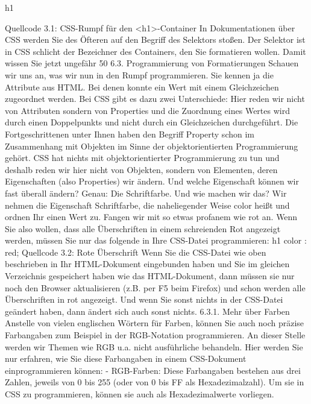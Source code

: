 h1 {
	
}
Quellcode 3.1: CSS-Rumpf für den <h1>-Container
In Dokumentationen über CSS werden Sie des Öfteren auf den Begriff des Selektors stoßen. Der Selektor ist in CSS schlicht der Bezeichner des Containers, den Sie formatieren wollen.
Damit wissen Sie jetzt ungefähr 50%
6.3.	Programmierung von Formatierungen
Schauen wir uns an, was wir nun in den Rumpf programmieren. Sie kennen ja die Attribute aus HTML. Bei denen konnte ein Wert mit einem Gleichzeichen zugeordnet werden. Bei CSS gibt es dazu zwei Unterschiede: Hier reden wir nicht von Attributen sondern von Properties und die Zuordnung eines Wertes wird durch einen Doppelpunkts und nicht durch ein Gleichzeichen durchgeführt. Die Fortgeschrittenen unter Ihnen haben den Begriff Property schon im Zusammenhang mit Objekten im Sinne der objektorientierten Programmierung gehört. CSS hat nichts mit objektorientierter Programmierung zu tun und deshalb reden wir hier nicht von Objekten, sondern von Elementen, deren Eigenschaften (also Properties) wir ändern.
Und welche Eigenschaft können wir fast überall ändern? Genau: Die Schriftfarbe. Und wie machen wir das? Wir nehmen die Eigenschaft Schriftfarbe, die naheliegender Weise color heißt und ordnen Ihr einen Wert zu. Fangen wir mit so etwas profanem wie rot an. Wenn Sie also wollen, dass alle Überschriften in einem schreienden Rot angezeigt werden, müssen Sie nur das folgende in Ihre CSS-Datei programmieren: 
h1 {
	color : red;
}
Quellcode 3.2: Rote Überschrift
Wenn Sie die CSS-Datei wie oben beschrieben in Ihr HTML-Dokument eingebunden haben und Sie im gleichen Verzeichnis gespeichert haben wie das HTML-Dokument, dann müssen sie nur noch den Browser aktualisieren (z.B. per F5 beim Firefox) und schon werden alle Überschriften in rot angezeigt. Und wenn Sie sonst nichts in der CSS-Datei geändert haben, dann ändert sich auch sonst nichts.
6.3.1.	Mehr über Farben
Anstelle von vielen englischen Wörtern für Farben, können Sie auch noch präzise Farbangaben zum Beispiel in der RGB-Notation programmieren.
An dieser Stelle werden wir Themen wie RGB u.a. nicht ausführliche behandeln. Hier werden Sie nur erfahren, wie Sie diese Farbangaben in einem CSS-Dokument einprogrammieren können:
-	RGB-Farben: Diese Farbangaben bestehen aus drei Zahlen, jeweils von 0 bis 255 (oder von 0 bis FF als Hexadezimalzahl). Um sie in CSS zu programmieren, können sie auch als Hexadezimalwerte vorliegen.

